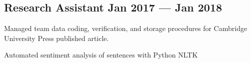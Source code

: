 \documentclass[%
               doublesided,
               paper=a4,
               fontsize=10.5pt
              ]{my-resume}
\begin{document}
{    \subsection{{Research Assistant \hfill Jan 2017 --- Jan 2018}}
    \begin{zitemize}
        \item{Managed team data coding, verification, and storage procedures for Cambridge \\University Press published article.}
        \item{Automated sentiment analysis of sentences with Python NLTK}
    \end{zitemize}
    
    


}
\end{document}

